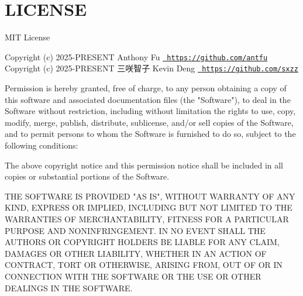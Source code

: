 \chapter{LICENSE}
\hypertarget{md_node__modules_2eslint-plugin-pnpm_2_l_i_c_e_n_s_e}{}\label{md_node__modules_2eslint-plugin-pnpm_2_l_i_c_e_n_s_e}
MIT License

Copyright (c) 2025-\/PRESENT Anthony Fu \href{https://github.com/antfu}{\texttt{ https\+://github.\+com/antfu}} Copyright (c) 2025-\/PRESENT 三咲智子 Kevin Deng \href{https://github.com/sxzz}{\texttt{ https\+://github.\+com/sxzz}}

Permission is hereby granted, free of charge, to any person obtaining a copy of this software and associated documentation files (the "{}\+Software"{}), to deal in the Software without restriction, including without limitation the rights to use, copy, modify, merge, publish, distribute, sublicense, and/or sell copies of the Software, and to permit persons to whom the Software is furnished to do so, subject to the following conditions\+:

The above copyright notice and this permission notice shall be included in all copies or substantial portions of the Software.

THE SOFTWARE IS PROVIDED "{}\+AS IS"{}, WITHOUT WARRANTY OF ANY KIND, EXPRESS OR IMPLIED, INCLUDING BUT NOT LIMITED TO THE WARRANTIES OF MERCHANTABILITY, FITNESS FOR A PARTICULAR PURPOSE AND NONINFRINGEMENT. IN NO EVENT SHALL THE AUTHORS OR COPYRIGHT HOLDERS BE LIABLE FOR ANY CLAIM, DAMAGES OR OTHER LIABILITY, WHETHER IN AN ACTION OF CONTRACT, TORT OR OTHERWISE, ARISING FROM, OUT OF OR IN CONNECTION WITH THE SOFTWARE OR THE USE OR OTHER DEALINGS IN THE SOFTWARE. 